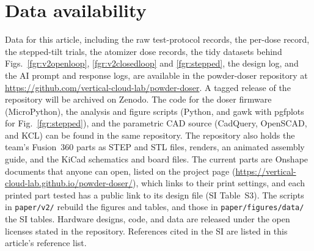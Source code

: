 \documentclass[twoside,twocolumn,9pt]{article}
\begin{document}
\section*{Data availability}
Data for this article, including the raw test-protocol records, the per-dose record, the stepped-tilt trials, the atomizer dose records, the tidy datasets behind Figs.~\ref{fgr:v2openloop}, \ref{fgr:v2closedloop} and \ref{fgr:stepped}, the design log, and the AI prompt and response logs, are available in the powder-doser repository at \url{https://github.com/vertical-cloud-lab/powder-doser}. A tagged release of the repository will be archived on Zenodo. The code for the doser firmware (MicroPython), the analysis and figure scripts (Python, and gawk with pgfplots for Fig.~\ref{fgr:stepped}), and the parametric CAD source (CadQuery, OpenSCAD, and KCL) can be found in the same repository. The repository also holds the team's Fusion~360 parts as STEP and STL files, renders, an animated assembly guide, and the KiCad schematics and board files. The current parts are Onshape documents that anyone can open, listed on the project page (\url{https://vertical-cloud-lab.github.io/powder-doser/}), which links to their print settings, and each printed part tested has a public link to its design file (SI Table~S3). The scripts in \texttt{paper/v2/} rebuild the figures and tables, and those in \texttt{paper/figures/data/} the SI tables. Hardware designs, code, and data are released under the open licenses stated in the repository. References cited in the SI are listed in this article's reference list.
\end{document}
